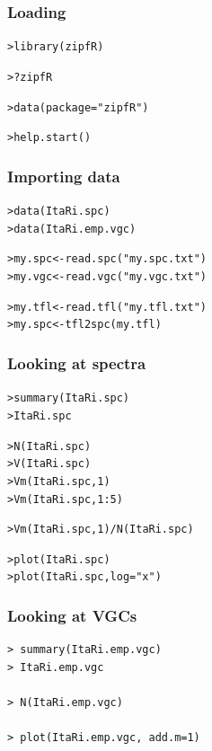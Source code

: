 \documentclass[t]{beamer} %
\begin{document}
\begin{frame}[fragile]
  \frametitle{Loading}

\begin{alltt}
> library(zipfR)

> ?zipfR

> data(package="zipfR")

> help.start() 
\end{alltt}

\end{frame}


\begin{frame}[fragile]
  \frametitle{Importing data}

\begin{alltt}
> data(ItaRi.spc)     
> data(ItaRi.emp.vgc)

> my.spc <- read.spc("my.spc.txt")
> my.vgc <- read.vgc("my.vgc.txt")

> my.tfl <- read.tfl("my.tfl.txt")
> my.spc <- tfl2spc(my.tfl) 
\end{alltt}

\end{frame}

\begin{frame}[fragile]
  \frametitle{Looking at spectra}

\begin{alltt}
> summary(ItaRi.spc)
> ItaRi.spc

> N(ItaRi.spc)
> V(ItaRi.spc)
> Vm(ItaRi.spc, 1)
> Vm(ItaRi.spc, 1:5)

> Vm(ItaRi.spc, 1) / N(ItaRi.spc)

> plot(ItaRi.spc)
> plot(ItaRi.spc, log="x")
\end{alltt}
\end{frame}

\begin{frame}[fragile]
  \frametitle{Looking at VGCs}

\begin{verbatim}
> summary(ItaRi.emp.vgc)
> ItaRi.emp.vgc

> N(ItaRi.emp.vgc)

> plot(ItaRi.emp.vgc, add.m=1)
\end{verbatim}
\end{frame}
\end{document}
